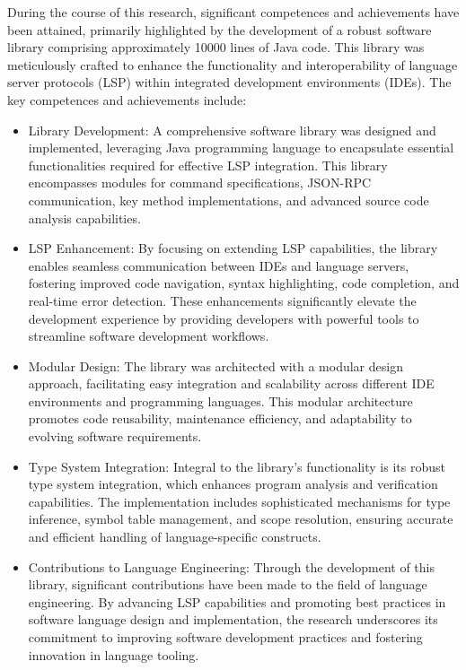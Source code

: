 \documentclass{adapt-lab}
\begin{document}
During the course of this research, significant competences and achievements have been attained, primarily highlighted by the development of a robust software library comprising approximately 10000 lines of Java code. This library was meticulously crafted to enhance the functionality and interoperability of language server protocols (LSP) within integrated development environments (IDEs). The key competences and achievements include:
\begin{itemize}
    \item Library Development: A comprehensive software library was designed and implemented, leveraging Java programming language to encapsulate essential functionalities required for effective LSP integration. This library encompasses modules for command specifications, JSON-RPC communication, key method implementations, and advanced source code analysis capabilities.
    \item LSP Enhancement: By focusing on extending LSP capabilities, the library enables seamless communication between IDEs and language servers, fostering improved code navigation, syntax highlighting, code completion, and real-time error detection. These enhancements significantly elevate the development experience by providing developers with powerful tools to streamline software development workflows.
    \item Modular Design: The library was architected with a modular design approach, facilitating easy integration and scalability across different IDE environments and programming languages. This modular architecture promotes code reusability, maintenance efficiency, and adaptability to evolving software requirements.
    \item Type System Integration: Integral to the library's functionality is its robust type system integration, which enhances program analysis and verification capabilities. The implementation includes sophisticated mechanisms for type inference, symbol table management, and scope resolution, ensuring accurate and efficient handling of language-specific constructs.
    \item Contributions to Language Engineering: Through the development of this library, significant contributions have been made to the field of language engineering. By advancing LSP capabilities and promoting best practices in software language design and implementation, the research underscores its commitment to improving software development practices and fostering innovation in language tooling.
\end{itemize}
\end{document}
